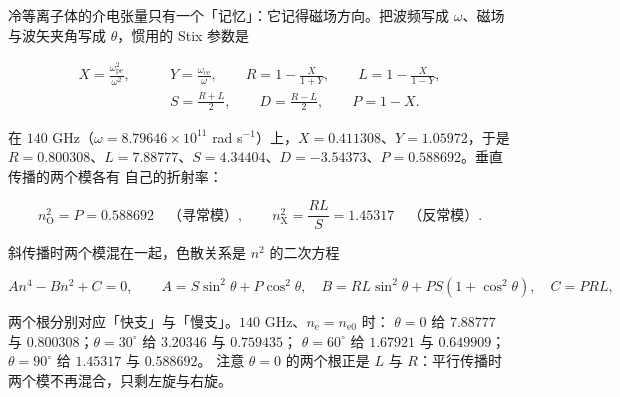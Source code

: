 冷等离子体的介电张量只有一个「记忆」：它记得磁场方向。把波频写成 $\omega$、磁场与波矢夹角写成
$\theta$，惯用的 Stix 参数是

\begin{equation}
\begin{aligned}
X=\frac{\omega_\mathrm{pe}^2}{\omega^2},\qquad &Y=\frac{\omega_\mathrm{ce}}{\omega},\qquad
R=1-\frac{X}{1+Y},\qquad L=1-\frac{X}{1-Y},\\
&S=\frac{R+L}{2},\qquad D=\frac{R-L}{2},\qquad P=1-X .
\end{aligned}
\label{eq:app-at-rlsp}
\end{equation}

在 $140$ GHz（$\omega=8.79646\times10^{11}$ rad s$^{-1}$）上，$X=0.411308$、$Y=1.05972$，于是
$R=0.800308$、$L=7.88777$、$S=4.34404$、$D=-3.54373$、$P=0.588692$。垂直传播的两个模各有
自己的折射率：

\begin{equation}
n_\mathrm{O}^2=P=0.588692 \quad\text{（寻常模）},\qquad
n_\mathrm{X}^2=\frac{RL}{S}=1.45317 \quad\text{（反常模）}.
\label{eq:app-at-no}
\end{equation}

斜传播时两个模混在一起，色散关系是 $n^2$ 的二次方程

\begin{equation}
An^4-Bn^2+C=0,\qquad
A=S\sin^2\theta+P\cos^2\theta,\quad
B=RL\sin^2\theta+PS(1+\cos^2\theta),\quad
C=PRL ,
\label{eq:app-at-stix}
\end{equation}

两个根分别对应「快支」与「慢支」。$140$ GHz、$n_\mathrm{e}=n_\mathrm{e0}$ 时：
$\theta=0$ 给 $7.88777$ 与 $0.800308$；$\theta=30^\circ$ 给 $3.20346$ 与 $0.759435$；
$\theta=60^\circ$ 给 $1.67921$ 与 $0.649909$；$\theta=90^\circ$ 给 $1.45317$ 与 $0.588692$。
注意 $\theta=0$ 的两个根正是 $L$ 与 $R$：平行传播时两个模不再混合，只剩左旋与右旋。

